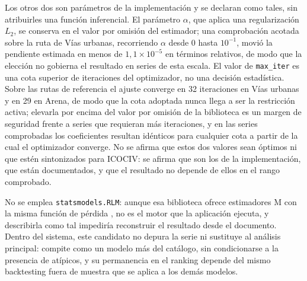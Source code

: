 \documentclass[12pt,letterpaper]{article}
\providecommand{\parencite}{\citep}
\newcommand{\ICOCIV}{ICOCIV}
\begin{document}
Los otros dos son parámetros de la implementación y se declaran como tales, sin atribuirles una función inferencial. El parámetro \(\alpha\), que aplica una regularización \(L_2\), se conserva en el valor por omisión del estimador; una comprobación acotada sobre la ruta de Vías urbanas, recorriendo \(\alpha\) desde 0 hasta \(10^{-1}\), movió la pendiente estimada en menos de \(1{,}1\times 10^{-5}\) en términos relativos, de modo que la elección no gobierna el resultado en series de esta escala. El valor de \texttt{max\_iter} es una cota superior de iteraciones del optimizador, no una decisión estadística. Sobre las rutas de referencia el ajuste converge en 32 iteraciones en Vías urbanas y en 29 en Arena, de modo que la cota adoptada nunca llega a ser la restricción activa; elevarla por encima del valor por omisión de la biblioteca es un margen de seguridad frente a series que requieran más iteraciones, y en las series comprobadas los coeficientes resultan idénticos para cualquier cota a partir de la cual el optimizador converge. No se afirma que estos dos valores sean óptimos ni que estén sintonizados para \ICOCIV{}: se afirma que son los de la implementación, que están documentados, y que el resultado no depende de ellos en el rango comprobado.

No se emplea \texttt{statsmodels.RLM}: aunque esa biblioteca ofrece estimadores M con la misma función de pérdida \parencite{statsmodels_rlm}, no es el motor que la aplicación ejecuta, y describirla como tal impediría reconstruir el resultado desde el documento. Dentro del sistema, este candidato no depura la serie ni sustituye al análisis principal: compite como un modelo más del catálogo, sin condicionarse a la presencia de atípicos, y su permanencia en el ranking depende del mismo backtesting fuera de muestra que se aplica a los demás modelos.
\end{document}
